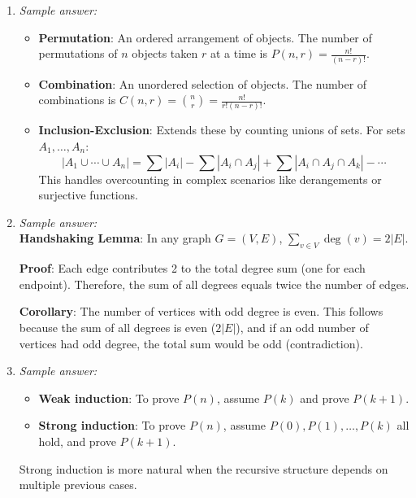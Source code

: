\documentclass[11pt]{article}
\begin{document}
\begin{enumerate}[label=\textbf{\arabic*.}]
  \textbf{Only if direction}: Suppose $G$ has no odd cycles. Pick any vertex $v$ and perform BFS. 
  Color vertices at even distance from $v$ with one color, and odd distance with another. If there's 
  an edge within the same color class, it would create an odd cycle (contradiction). Thus $G$ is bipartite.

  \textbf{Application to $K_n$}: The complete graph $K_n$ contains triangles (3-cycles) for $n \geq 3$, 
  which are odd. Therefore $K_n$ is not bipartite for $n \geq 3$. For $n \leq 2$, there are no cycles 
  at all, so $K_n$ is trivially bipartite.

  \item \emph{Sample answer:}\\
  \begin{itemize}
    \item \textbf{Permutation}: An ordered arrangement of objects. The number of permutations of 
    $n$ objects taken $r$ at a time is $P(n,r) = \frac{n!}{(n-r)!}$.
    \item \textbf{Combination}: An unordered selection of objects. The number of combinations is 
    $C(n,r) = \binom{n}{r} = \frac{n!}{r!(n-r)!}$.
    \item \textbf{Inclusion-Exclusion}: Extends these by counting unions of sets. For sets $A_1, \ldots, A_n$:
    $$|A_1 \cup \cdots \cup A_n| = \sum |A_i| - \sum |A_i \cap A_j| + \sum |A_i \cap A_j \cap A_k| - \cdots$$
    This handles overcounting in complex scenarios like derangements or surjective functions.
  \end{itemize}

  \item \emph{Sample answer:}\\
  \textbf{Handshaking Lemma}: In any graph $G = (V, E)$, $\sum_{v \in V} \deg(v) = 2|E|$.

  \textbf{Proof}: Each edge contributes 2 to the total degree sum (one for each endpoint). 
  Therefore, the sum of all degrees equals twice the number of edges.

  \textbf{Corollary}: The number of vertices with odd degree is even. This follows because the 
  sum of all degrees is even ($2|E|$), and if an odd number of vertices had odd degree, the total 
  sum would be odd (contradiction).

  \item \emph{Sample answer:}\\
  \begin{itemize}
    \item \textbf{Weak induction}: To prove $P(n)$, assume $P(k)$ and prove $P(k+1)$.
    \item \textbf{Strong induction}: To prove $P(n)$, assume $P(0), P(1), \ldots, P(k)$ all hold, 
    and prove $P(k+1)$.
  \end{itemize}
  Strong induction is more natural when the recursive structure depends on multiple previous cases.


\end{enumerate}
\end{document}
